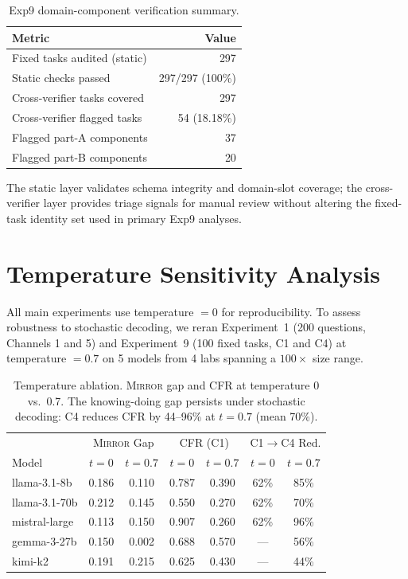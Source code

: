 \documentclass[10pt]{article}
\newcommand{\mirror}{\textsc{Mirror}}
\begin{document}
\begin{table}[h]
\centering
\caption{Exp9 domain-component verification summary.}
\label{tab:exp9-mapping-validity}
\small
\begin{tabular}{lr}
\toprule
Metric & Value \\
\midrule
Fixed tasks audited (static) & 297 \\
Static checks passed & 297/297 (100\%) \\
Cross-verifier tasks covered & 297 \\
Cross-verifier flagged tasks & 54 (18.18\%) \\
Flagged part-A components & 37 \\
Flagged part-B components & 20 \\
\bottomrule
\end{tabular}
\end{table}

The static layer validates schema integrity and domain-slot coverage; the
cross-verifier layer provides triage signals for manual review without altering
the fixed-task identity set used in primary Exp9 analyses.

\section{Temperature Sensitivity Analysis}
\label{app:temp}

All main experiments use temperature $= 0$ for reproducibility. To assess robustness to stochastic decoding, we reran Experiment~1 (200 questions, Channels 1 and 5) and Experiment~9 (100 fixed tasks, C1 and C4) at temperature $= 0.7$ on 5 models from 4 labs spanning a $100\times$ size range.

\begin{table}[h]
\centering
\caption{Temperature ablation. \mirror{} gap and CFR at temperature 0 vs.\ 0.7. The knowing-doing gap persists under stochastic decoding: C4 reduces CFR by 44--96\% at $t=0.7$ (mean 70\%).}
\label{tab:temp-ablation}
\small
\begin{tabular}{lcccccc}
\toprule
& \multicolumn{2}{c}{\mirror{} Gap} & \multicolumn{2}{c}{CFR (C1)} & \multicolumn{2}{c}{C1$\to$C4 Red.} \\
Model & $t{=}0$ & $t{=}0.7$ & $t{=}0$ & $t{=}0.7$ & $t{=}0$ & $t{=}0.7$ \\
\midrule
llama-3.1-8b & 0.186 & 0.110 & 0.787 & 0.390 & 62\% & 85\% \\
llama-3.1-70b & 0.212 & 0.145 & 0.550 & 0.270 & 62\% & 70\% \\
mistral-large & 0.113 & 0.150 & 0.907 & 0.260 & 62\% & 96\% \\
gemma-3-27b & 0.150 & 0.002 & 0.688 & 0.570 & --- & 56\% \\
kimi-k2 & 0.191 & 0.215 & 0.625 & 0.430 & --- & 44\% \\
\bottomrule
\end{tabular}
\end{table}
\end{document}
